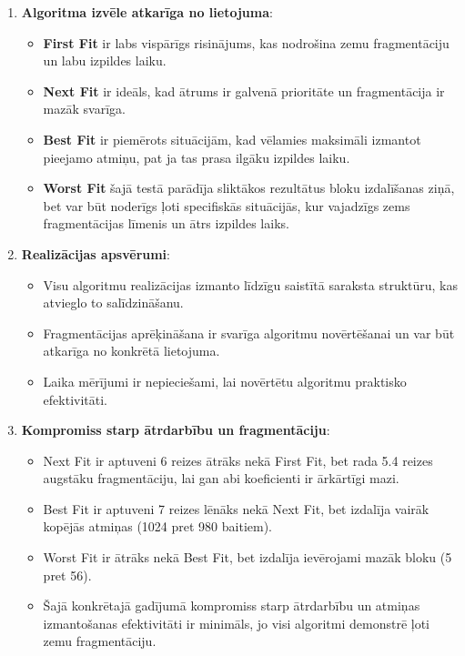 \documentclass{report}
\begin{document}
	\begin{enumerate}
		\item \textbf{Algoritma izvēle atkarīga no lietojuma}:
		\begin{itemize}
			\item \textbf{First Fit} ir labs vispārīgs risinājums, kas nodrošina zemu fragmentāciju un labu izpildes laiku.
			\item \textbf{Next Fit} ir ideāls, kad ātrums ir galvenā prioritāte un fragmentācija ir mazāk svarīga.
			\item \textbf{Best Fit} ir piemērots situācijām, kad vēlamies maksimāli izmantot pieejamo atmiņu, pat ja tas prasa ilgāku izpildes laiku.
			\item \textbf{Worst Fit} šajā testā parādīja sliktākos rezultātus bloku izdalīšanas ziņā, bet var būt noderīgs ļoti specifiskās situācijās, kur vajadzīgs zems fragmentācijas līmenis un ātrs izpildes laiks.
		\end{itemize}
		
		\item \textbf{Realizācijas apsvērumi}:
		\begin{itemize}
			\item Visu algoritmu realizācijas izmanto līdzīgu saistītā saraksta struktūru, kas atvieglo to salīdzināšanu.
			\item Fragmentācijas aprēķināšana ir svarīga algoritmu novērtēšanai un var būt atkarīga no konkrētā lietojuma.
			\item Laika mērījumi ir nepieciešami, lai novērtētu algoritmu praktisko efektivitāti.
		\end{itemize}
		
		\item \textbf{Kompromiss starp ātrdarbību un fragmentāciju}:
		\begin{itemize}
			\item Next Fit ir aptuveni 6 reizes ātrāks nekā First Fit, bet rada 5.4 reizes augstāku fragmentāciju, lai gan abi koeficienti ir ārkārtīgi mazi.
			\item Best Fit ir aptuveni 7 reizes lēnāks nekā Next Fit, bet izdalīja vairāk kopējās atmiņas (1024 pret 980 baitiem).
			\item Worst Fit ir ātrāks nekā Best Fit, bet izdalīja ievērojami mazāk bloku (5 pret 56).
			\item Šajā konkrētajā gadījumā kompromiss starp ātrdarbību un atmiņas izmantošanas efektivitāti ir minimāls, jo visi algoritmi demonstrē ļoti zemu fragmentāciju.
		\end{itemize}
		

\end{enumerate}
\end{document}
